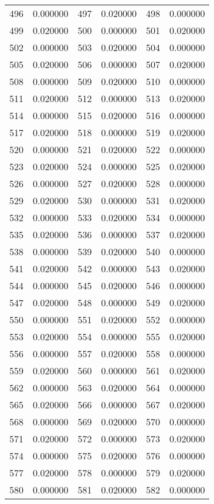 \documentclass[12pt]{article}
\begin{document}
\begin{longtable}{@{}cc|cc|cc@{}}
496 & 0.000000 & 497 & 0.020000 & 498 & 0.000000 \\
499 & 0.020000 & 500 & 0.000000 & 501 & 0.020000 \\
502 & 0.000000 & 503 & 0.020000 & 504 & 0.000000 \\
505 & 0.020000 & 506 & 0.000000 & 507 & 0.020000 \\
508 & 0.000000 & 509 & 0.020000 & 510 & 0.000000 \\
511 & 0.020000 & 512 & 0.000000 & 513 & 0.020000 \\
514 & 0.000000 & 515 & 0.020000 & 516 & 0.000000 \\
517 & 0.020000 & 518 & 0.000000 & 519 & 0.020000 \\
520 & 0.000000 & 521 & 0.020000 & 522 & 0.000000 \\
523 & 0.020000 & 524 & 0.000000 & 525 & 0.020000 \\
526 & 0.000000 & 527 & 0.020000 & 528 & 0.000000 \\
529 & 0.020000 & 530 & 0.000000 & 531 & 0.020000 \\
532 & 0.000000 & 533 & 0.020000 & 534 & 0.000000 \\
535 & 0.020000 & 536 & 0.000000 & 537 & 0.020000 \\
538 & 0.000000 & 539 & 0.020000 & 540 & 0.000000 \\
541 & 0.020000 & 542 & 0.000000 & 543 & 0.020000 \\
544 & 0.000000 & 545 & 0.020000 & 546 & 0.000000 \\
547 & 0.020000 & 548 & 0.000000 & 549 & 0.020000 \\
550 & 0.000000 & 551 & 0.020000 & 552 & 0.000000 \\
553 & 0.020000 & 554 & 0.000000 & 555 & 0.020000 \\
556 & 0.000000 & 557 & 0.020000 & 558 & 0.000000 \\
559 & 0.020000 & 560 & 0.000000 & 561 & 0.020000 \\
562 & 0.000000 & 563 & 0.020000 & 564 & 0.000000 \\
565 & 0.020000 & 566 & 0.000000 & 567 & 0.020000 \\
568 & 0.000000 & 569 & 0.020000 & 570 & 0.000000 \\
571 & 0.020000 & 572 & 0.000000 & 573 & 0.020000 \\
574 & 0.000000 & 575 & 0.020000 & 576 & 0.000000 \\
577 & 0.020000 & 578 & 0.000000 & 579 & 0.020000 \\
580 & 0.000000 & 581 & 0.020000 & 582 & 0.000000 \\

\end{longtable}
\end{document}
